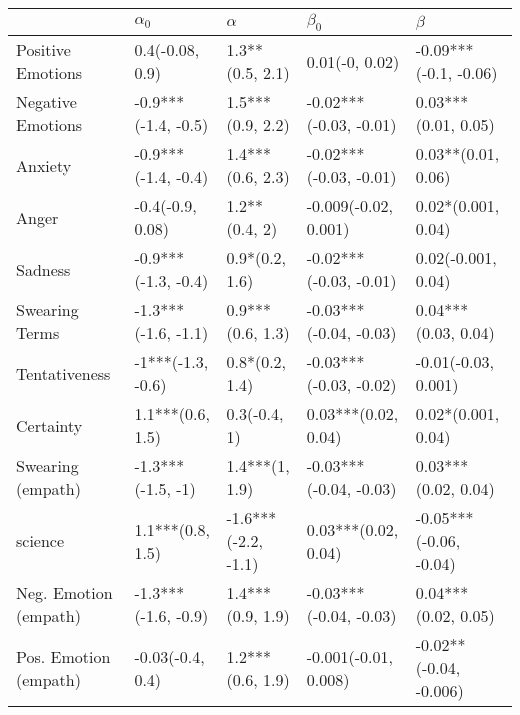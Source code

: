 \begin{tabular}{lllll}
\toprule
{} &           $\alpha_0$ &             $\alpha$ &               $\beta_0$ &                 $\beta$ \\
\midrule
Positive Emotions     &      0.4(-0.08, 0.9) &      1.3**(0.5, 2.1) &          0.01(-0, 0.02) &   -0.09***(-0.1, -0.06) \\
Negative Emotions     &  -0.9***(-1.4, -0.5) &     1.5***(0.9, 2.2) &  -0.02***(-0.03, -0.01) &     0.03***(0.01, 0.05) \\
Anxiety               &  -0.9***(-1.4, -0.4) &     1.4***(0.6, 2.3) &  -0.02***(-0.03, -0.01) &      0.03**(0.01, 0.06) \\
Anger                 &     -0.4(-0.9, 0.08) &        1.2**(0.4, 2) &    -0.009(-0.02, 0.001) &      0.02*(0.001, 0.04) \\
Sadness               &  -0.9***(-1.3, -0.4) &       0.9*(0.2, 1.6) &  -0.02***(-0.03, -0.01) &      0.02(-0.001, 0.04) \\
Swearing Terms        &  -1.3***(-1.6, -1.1) &     0.9***(0.6, 1.3) &  -0.03***(-0.04, -0.03) &     0.04***(0.03, 0.04) \\
Tentativeness         &    -1***(-1.3, -0.6) &       0.8*(0.2, 1.4) &  -0.03***(-0.03, -0.02) &     -0.01(-0.03, 0.001) \\
Certainty             &     1.1***(0.6, 1.5) &         0.3(-0.4, 1) &     0.03***(0.02, 0.04) &      0.02*(0.001, 0.04) \\
Swearing (empath)     &    -1.3***(-1.5, -1) &       1.4***(1, 1.9) &  -0.03***(-0.04, -0.03) &     0.03***(0.02, 0.04) \\
science               &     1.1***(0.8, 1.5) &  -1.6***(-2.2, -1.1) &     0.03***(0.02, 0.04) &  -0.05***(-0.06, -0.04) \\
Neg. Emotion (empath) &  -1.3***(-1.6, -0.9) &     1.4***(0.9, 1.9) &  -0.03***(-0.04, -0.03) &     0.04***(0.02, 0.05) \\
Pos. Emotion (empath) &     -0.03(-0.4, 0.4) &     1.2***(0.6, 1.9) &    -0.001(-0.01, 0.008) &  -0.02**(-0.04, -0.006) \\
\bottomrule
\end{tabular}
